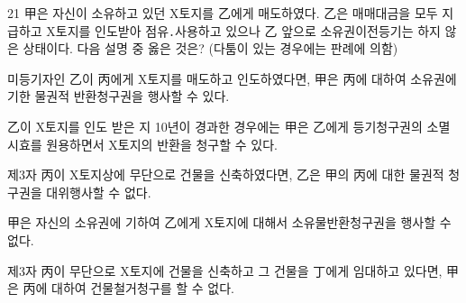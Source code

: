 \begin{question}{21}
甲은 자신이 소유하고 있던 X토지를 乙에게 매도하였다. 乙은 매매대금을 모두 지급하고 X토지를 인도받아 점유․사용하고 있으나 乙 앞으로 소유권이전등기는 하지 않은 상태이다. 다음 설명 중 옳은 것은? (다툼이 있는 경우에는 판례에 의함)
\begin{choices}
  \item 미등기자인 乙이 丙에게 X토지를 매도하고 인도하였다면, 甲은 丙에 대하여 소유권에 기한 물권적 반환청구권을 행사할 수 있다.
  \item 乙이 X토지를 인도 받은 지 10년이 경과한 경우에는 甲은 乙에게 등기청구권의 소멸시효를 원용하면서 X토지의 반환을 청구할 수 있다.
  \item 제3자 丙이 X토지상에 무단으로 건물을 신축하였다면, 乙은 甲의 丙에 대한 물권적 청구권을 대위행사할 수 없다.
  \item 甲은 자신의 소유권에 기하여 乙에게 X토지에 대해서 소유물반환청구권을 행사할 수 없다.
  \item 제3자 丙이 무단으로 X토지에 건물을 신축하고 그 건물을 丁에게 임대하고 있다면, 甲은 丙에 대하여 건물철거청구를 할 수 없다.
\end{choices}
\end{question}
